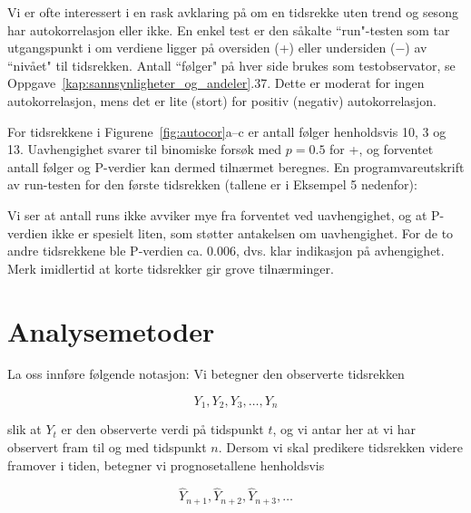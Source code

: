 Vi er ofte interessert i en rask avklaring på om en tidsrekke uten trend og
sesong har autokorrelasjon eller ikke. En enkel test er den såkalte 
``run"-testen som tar utgangspunkt i om verdiene ligger på oversiden (+) 
eller undersiden ($-$) av ``nivået" til tidsrekken.
Antall ``følger" på hver side brukes som test\-observator,
se Oppgave~\ref*{kap:sannsynligheter_og_andeler}.37. Dette er moderat for ingen autokorrelasjon, 
mens det er lite (stort) for positiv (negativ) autokorrelasjon.  

For tidsrekkene i Figurene~\ref{fig:autocor}a--c er antall følger henholdsvis 10, 3 og 13.
Uavhengighet svarer til binomiske forsøk med $p=0.5$ for +,
og forventet antall følger og P-verdier kan dermed tilnærmet beregnes. 
En programvareutskrift av run-testen for den første tidsrekken 
(tallene er i Eksempel 5 nedenfor):

\begin{center}  \end{center}
Vi ser at antall runs ikke avviker mye fra forventet ved uavhengighet, og at
P-verdien ikke er spesielt liten, som støtter antakelsen om uavhengighet.
For de to andre tidsrekkene ble P-verdien ca. 0.006, dvs. klar indikasjon 
på avhengighet. 
Merk imidlertid at korte tidsrekker gir grove tilnærminger. \\[0.5cm]

\section{Analysemetoder}
La oss innføre følgende notasjon:  Vi betegner den observerte tidsrekken

\[  Y_1, Y_2, Y_3, \ldots, Y_n    \]

\noindent slik at $Y_t$ er den observerte verdi på tidspunkt $t$, og vi
antar her at vi har observert fram til og med tidspunkt $n$. Dersom vi skal
predikere tidsrekken videre framover i tiden, betegner vi prognosetallene
henholdsvis

\[ \hat{Y}_{n+1},\hat{Y}_{n+2},\hat{Y}_{n+3},\ldots \]

